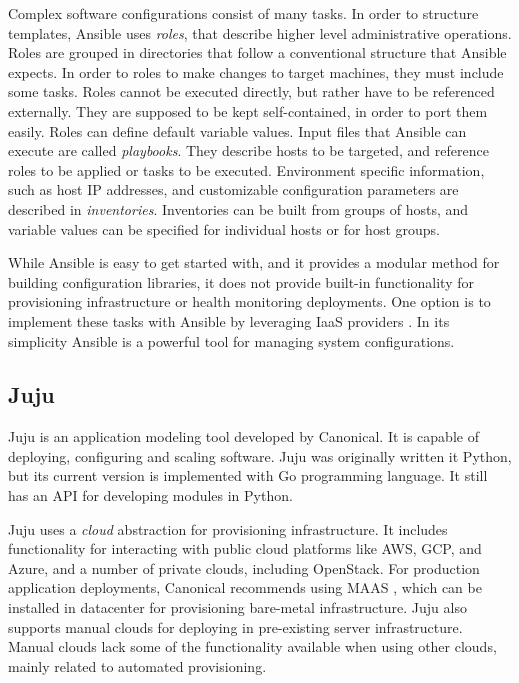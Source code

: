 Complex software configurations consist of many tasks. In order to structure
templates, Ansible uses \textit{roles}, that describe higher level
administrative operations. Roles are grouped in directories that follow a
conventional structure that Ansible expects. In order to roles to make changes
to target machines, they must include some tasks. Roles cannot be executed
directly, but rather have to be referenced externally. They are supposed to be
kept self-contained, in order to port them easily. Roles can define default
variable values. Input files that Ansible can execute are called
\textit{playbooks}. They describe hosts to be targeted, and reference roles to
be applied or tasks to be executed. Environment specific information, such as
host IP addresses, and customizable configuration parameters are described in
\textit{inventories}. Inventories can be built from groups of hosts, and
variable values can be specified for individual hosts or for host groups.

While Ansible is easy to get started with, and it provides a modular method for
building configuration libraries, it does not provide built-in functionality
for provisioning infrastructure or health monitoring deployments. One option is
to implement these tasks with Ansible by leveraging IaaS providers
\cite{singh2015automated}. In its simplicity Ansible is a powerful tool for
managing system configurations.

\subsection{Juju}

Juju \cite{juju} is an application modeling tool developed by Canonical. It is
capable of deploying, configuring and scaling software. Juju was originally
written it Python, but its current version is implemented with Go programming
language. It still has an API for developing modules in Python.

Juju uses a \textit{cloud} abstraction for provisioning infrastructure. It
includes functionality for interacting with public cloud platforms like AWS,
GCP, and Azure, and a number of private clouds, including OpenStack. For
production application deployments, Canonical recommends using MAAS
\cite{sirbu2015maas}, which can be installed in datacenter for provisioning
bare-metal infrastructure. Juju also supports manual clouds for deploying in
pre-existing server infrastructure. Manual clouds lack some of the
functionality available when using other clouds, mainly related to automated
provisioning.


